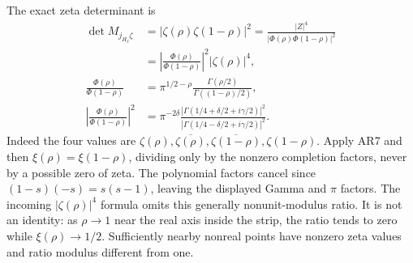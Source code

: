 \documentclass[11pt]{article}
\begin{document}
The exact zeta determinant is
\begin{align}
\det M_{j_{H_\delta}\zeta}
&=|\zeta(\rho)\zeta(1-\rho)|^2
=\frac{|Z|^4}{|\Phi(\rho)\Phi(1-\rho)|^2}\nonumber\\
&=\left|\frac{\Phi(\rho)}{\Phi(1-\rho)}\right|^2
                         |\zeta(\rho)|^4,\nonumber\\
\frac{\Phi(\rho)}{\Phi(1-\rho)}
&=\pi^{1/2-\rho}\frac{\Gamma(\rho/2)}{\Gamma((1-\rho)/2)},\nonumber\\
\left|\frac{\Phi(\rho)}{\Phi(1-\rho)}\right|^2
&=\pi^{-2\delta}
\frac{|\Gamma(1/4+\delta/2+i\gamma/2)|^2}
     {|\Gamma(1/4-\delta/2+i\gamma/2)|^2}.
\tag{AR13}
\end{align}
Indeed the four values are
$\zeta(\rho),\overline{\zeta(\rho)},
\overline{\zeta(1-\rho)},\zeta(1-\rho)$.
Apply AR7 and then $\xi(\rho)=\xi(1-\rho)$, dividing only
by the nonzero completion factors, never by a possible zero
of zeta. The polynomial factors cancel since
$(1-s)(-s)=s(s-1)$, leaving the displayed Gamma and $\pi$
factors. The incoming $|\zeta(\rho)|^4$ formula omits this
generally nonunit-modulus ratio. It is not an identity:
as $\rho\to1$ near the real axis inside the strip, the ratio
tends to zero while $\xi(\rho)\to1/2$. Sufficiently nearby
nonreal points have nonzero zeta values and ratio modulus
different from one.
\end{document}
